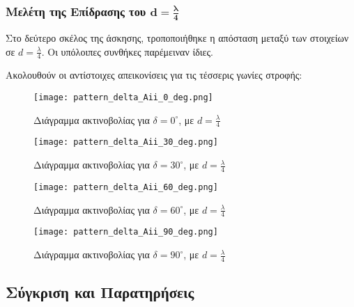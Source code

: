\documentclass[a4paper,12pt]{report}
\begin{document}
\subsubsection{Μελέτη της Επίδρασης του \(\mathbf{d = \frac{\lambda}{4}}\)}

Στο δεύτερο σκέλος της άσκησης, τροποποιήθηκε η απόσταση μεταξύ των στοιχείων σε \( d = \frac{\lambda}{4} \). Οι υπόλοιπες συνθήκες παρέμειναν ίδιες.

\vspace{0.3cm}

\hspace{-0.6cm}Ακολουθούν οι αντίστοιχες απεικονίσεις για τις τέσσερις γωνίες στροφής:

\begin{figure}[H]
    \centering
    \begin{minipage}[b]{0.48\textwidth}
        \centering
        \texttt{[image: pattern\_delta\_Aii\_0\_deg.png]}
        \caption{Διάγραμμα ακτινοβολίας για \( \delta = 0^\circ \), με \( d = \frac{\lambda}{4} \)}
    \end{minipage}
    \hfill
    \begin{minipage}[b]{0.48\textwidth}
        \centering
        \texttt{[image: pattern\_delta\_Aii\_30\_deg.png]}
        \caption{Διάγραμμα ακτινοβολίας για \( \delta = 30^\circ \), με \( d = \frac{\lambda}{4} \)}
    \end{minipage}
\end{figure}

\begin{figure}[H]
    \centering
    \begin{minipage}[b]{0.48\textwidth}
        \centering
        \texttt{[image: pattern\_delta\_Aii\_60\_deg.png]}
        \caption{Διάγραμμα ακτινοβολίας για \( \delta = 60^\circ \), με \( d = \frac{\lambda}{4} \)}
    \end{minipage}
    \hfill
    \begin{minipage}[b]{0.48\textwidth}
        \centering
        \texttt{[image: pattern\_delta\_Aii\_90\_deg.png]}
        \caption{Διάγραμμα ακτινοβολίας για \( \delta = 90^\circ \), με \( d = \frac{\lambda}{4} \)}
    \end{minipage}
\end{figure}


\subsection{Σύγκριση και Παρατηρήσεις}
\end{document}
